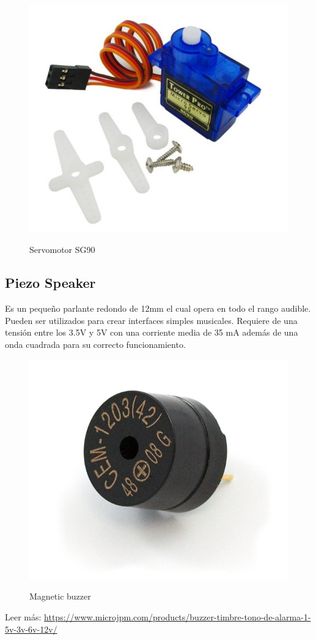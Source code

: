 \begin{figure}[H]
    \centering
    \includegraphics[width = 7 cm]{imagenes/servo.PNG}
    \caption{Servomotor SG90}
    \cite{servo}
\end{figure}

\subsection{Piezo Speaker}
Es un pequeño parlante redondo de 12mm el cual opera en todo el rango audible. Pueden ser utilizados para crear interfaces simples musicales. Requiere de una tensión entre los 3.5V y 5V con una corriente media de 35 mA además de una onda cuadrada para su correcto funcionamiento.

\begin{figure}[H]
    \centering
    \includegraphics[width = 7 cm]{imagenes/speaker.PNG}
    \caption{Magnetic buzzer}
    \cite{speaker}
\end{figure}

Leer más: \url{https://www.microjpm.com/products/buzzer-timbre-tono-de-alarma-1-5v-3v-6v-12v/}

